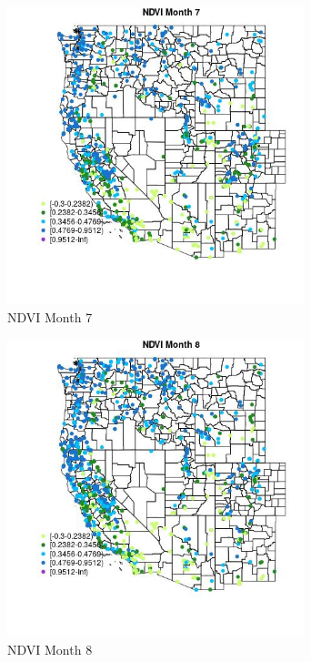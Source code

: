 \begin{figure} 
\centering  
\includegraphics[width=0.77\textwidth]{Code_Outputs/Report_ML_input_PM25_Step4_part_f_de_duplicated_aveswNAs_MapObsMo7NDVI.jpg} 
\caption{\label{fig:Report_ML_input_PM25_Step4_part_f_de_duplicated_aveswNAsMapObsMo7NDVI}NDVI Month 7} 
\end{figure} 
 

\clearpage 

\begin{figure} 
\centering  
\includegraphics[width=0.77\textwidth]{Code_Outputs/Report_ML_input_PM25_Step4_part_f_de_duplicated_aveswNAs_MapObsMo8NDVI.jpg} 
\caption{\label{fig:Report_ML_input_PM25_Step4_part_f_de_duplicated_aveswNAsMapObsMo8NDVI}NDVI Month 8} 
\end{figure} 
 

